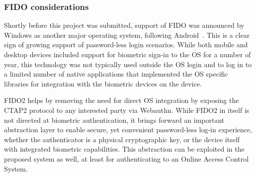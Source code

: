 \subsubsection*{FIDO considerations}
Shortly before this project was submitted, support of FIDO was announced by Windows as another major operating system, following Android~\cite{}. This is a clear sign of growing support of password-less login scenarios. While both mobile and desktop devices included support for biometric sign-in to the OS for a number of year, this technology was not typically used outside the OS login and to log in to a limited number of native applications that implemented the OS specific libraries for integration with the biometric devices on the device.

FIDO2 helps by removing the need for direct OS integration by exposing the CTAP2 protocol to any interested party via Webauthn. While FIDO2 in itself is not directed at biometric authentication, it brings forward an important abstraction layer to enable secure, yet convenient password-less log-in experience, whether the authenticator is a physical cryptographic key, or the device itself with integrated biometric capabilities. This abstraction can be exploited in the proposed system as well, at least for authenticating to an Online Access Control System.